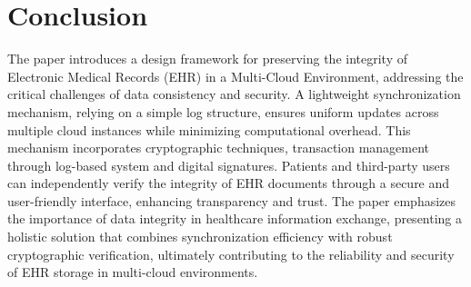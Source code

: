 \documentclass[runningheads]{llncs}
\begin{document}
\section{Conclusion}

The paper introduces a design framework for preserving the integrity of Electronic Medical Records (EHR) in a Multi-Cloud Environment, addressing the critical challenges of data consistency and security. A lightweight synchronization mechanism, relying on a simple log structure, ensures uniform updates across multiple cloud instances while minimizing computational overhead. This mechanism incorporates cryptographic techniques, transaction management through log-based system and digital signatures. Patients and third-party users can independently verify the integrity of EHR documents through a secure and user-friendly interface, enhancing transparency and trust. The paper emphasizes the importance of data integrity in healthcare information exchange, presenting a holistic solution that combines synchronization efficiency with robust cryptographic verification, ultimately contributing to the reliability and security of EHR storage in multi-cloud environments.
\end{document}
